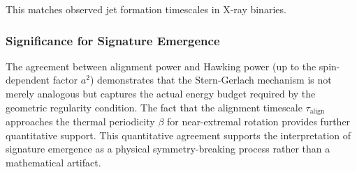 This matches observed jet formation timescales in X-ray binaries.

\subsubsection{Significance for Signature Emergence}

The agreement between alignment power and Hawking power (up to the spin-dependent factor $a^2$) demonstrates that the Stern-Gerlach mechanism is not merely analogous but captures the actual energy budget required by the geometric regularity condition. The fact that the alignment timescale $\tau_{\text{align}}$ approaches the thermal periodicity $\beta$ for near-extremal rotation provides further quantitative support. This quantitative agreement supports the interpretation of signature emergence as a physical symmetry-breaking process rather than a mathematical artifact.